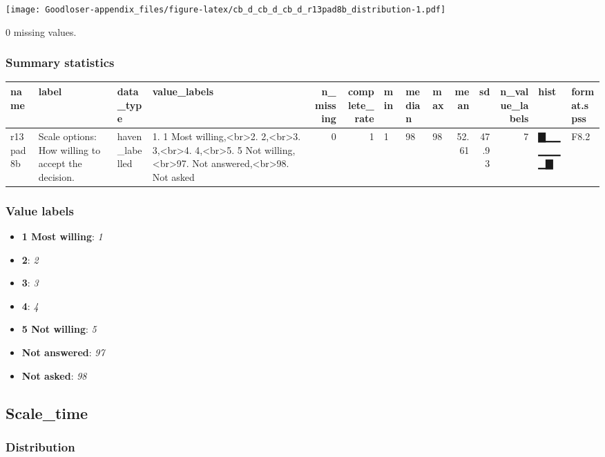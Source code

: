 \documentclass[
]{book}
\providecommand{\tightlist}{%
  \setlength{\itemsep}{0pt}\setlength{\parskip}{0pt}}
\begin{document}
\texttt{[image: Goodloser-appendix\_files/figure-latex/cb\_d\_cb\_d\_cb\_d\_r13pad8b\_distribution-1.pdf]}

0 missing values.

\hypertarget{r13pad8b_summary}{%
\subsubsection{Summary statistics}\label{r13pad8b_summary}}

\begin{tabular}{l|l|l|l|r|r|l|l|l|r|r|r|l|l}
\hline
name & label & data_type & value_labels & n_missing & complete_rate & min & median & max & mean & sd & n_value_labels & hist & format.spss\\
\hline
r13pad8b & Scale options: How willing to accept the decision. & haven_labelled & 1. 1 Most willing,<br>2. 2,<br>3. 3,<br>4. 4,<br>5. 5 Not willing,<br>97. Not answered,<br>98. Not asked & 0 & 1 & 1 & 98 & 98 & 52.61 & 47.93 & 7 & ▇▁▁▁▁▁▁▇ & F8.2\\
\hline
\end{tabular}

\hypertarget{r13pad8b_labels}{%
\subsubsection{Value labels}\label{r13pad8b_labels}}

\begin{itemize}
\tightlist
\item
  \textbf{1 Most willing}: \emph{1}
\item
  \textbf{2}: \emph{2}
\item
  \textbf{3}: \emph{3}
\item
  \textbf{4}: \emph{4}
\item
  \textbf{5 Not willing}: \emph{5}
\item
  \textbf{Not answered}: \emph{97}
\item
  \textbf{Not asked}: \emph{98}
\end{itemize}

\hypertarget{Scale_time}{%
\subsection{Scale\_time}\label{Scale_time}}

\hypertarget{Scale_time_distribution}{%
\subsubsection{Distribution}\label{Scale_time_distribution}}
\end{document}
